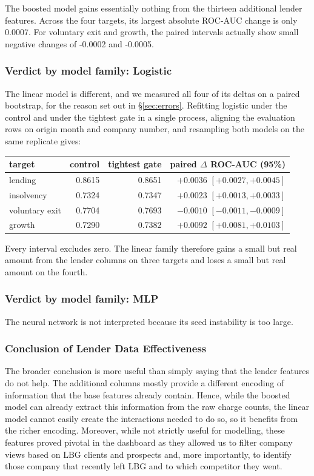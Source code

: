 \documentclass[    author={Samuel Menon Demelo; Sneha Saphala Ram Prasad; 
Viktor Ander Lindholm; Vishal Khatri},
               supervisor={Prof. Fernando Moreno-Pino},
                   degree={MSc},
                    title={Lloyds Commercial Banking Intelligence},
                 subtitle={Ranking SME Lending, Risk and Growth Prospects for Lloyds Banking Group},
                     type={},
                     year={2026}]{dissertation}
\begin{document}
The boosted model gains essentially nothing from the thirteen additional lender features. Across the four targets, its largest absolute ROC-AUC change is only 0.0007. For voluntary exit and growth, the paired intervals actually show small negative changes of -0.0002 and -0.0005.

\subsubsection{Verdict by model family: Logistic}
The linear model is different, and we measured all four of its deltas on a paired bootstrap, for the reason set out in \S\ref{sec:errors}. Refitting logistic under the control and under the tightest gate in a single process, aligning the evaluation rows on origin month and company number, and resampling both models on the same replicate gives:

\begin{collapsable}
\begin{center}
\begin{tabular}{lrrr}
\toprule
target & control & tightest gate & paired $\Delta$ ROC-AUC (95\%) \\
\midrule
lending & 0.8615 & 0.8651 & $+0.0036$ $[+0.0027, +0.0045]$ \\
insolvency & 0.7324 & 0.7347 & $+0.0023$ $[+0.0013, +0.0033]$ \\
voluntary exit & 0.7704 & 0.7693 & $-0.0010$ $[-0.0011, -0.0009]$ \\
growth & 0.7290 & 0.7382 & $+0.0092$ $[+0.0081, +0.0103]$ \\
\bottomrule
\end{tabular}
\end{center}
\end{collapsable}

Every interval excludes zero. The linear family therefore gains a small but real amount from the lender columns on three targets and loses a small but real amount on the fourth.

\subsubsection{Verdict by model family: MLP}
The neural network is not interpreted because its seed instability is too large.

\subsubsection{Conclusion of Lender Data Effectiveness}
The broader conclusion is more useful than simply saying that the lender features do not help. The additional columns mostly provide a different encoding of information that the base features already contain. Hence, while the boosted model can already extract this information from the raw charge counts, the linear model cannot easily create the interactions needed to do so, so it benefits from the richer encoding.
Moreover, while not strictly useful for modelling, these features proved pivotal in the dashboard as they allowed us to filter company views based on LBG clients and prospects and, more importantly, to identify those company that recently left LBG and to which competitor they went.
\end{document}
